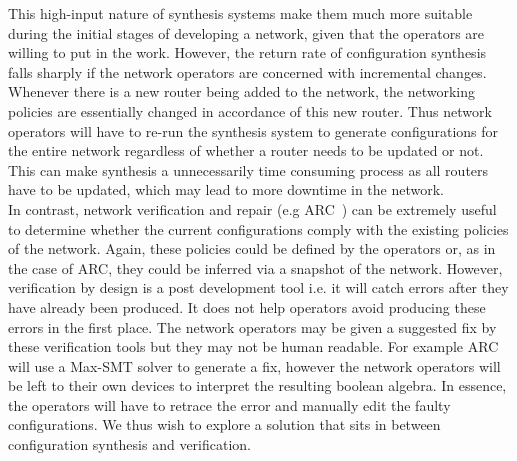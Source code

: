This high-input nature of synthesis systems make them much more suitable during the initial stages of developing a network, given that the operators are willing to put in the work. However, the return rate of configuration synthesis falls sharply if the network operators are concerned with incremental changes. Whenever there is a new router being added to the network, the networking policies are essentially changed in accordance of this new router. Thus network operators will have to re-run the synthesis system to generate configurations for the entire network regardless of whether a router needs to be updated or not. This can make synthesis a unnecessarily time consuming process as all routers have to be updated, which may lead to more downtime in the network.\\ 

In contrast, network verification and repair (e.g ARC~\cite{arc}) can be extremely useful to determine whether the current configurations comply with the existing policies of the network. Again, these policies could be defined by the operators or, as in the case of ARC, they could be inferred via a snapshot of the network. However, verification by design is a post development tool i.e. it will catch errors after they have already been produced. It does not help operators avoid producing these errors in the first place. The network operators may be given a suggested fix by these verification tools but they may not be human readable. For example ARC will use a Max-SMT solver to generate a fix, however the network operators will be left to their own devices to interpret the resulting boolean algebra. In essence, the operators will have to retrace the error and manually edit the faulty configurations. We thus wish to explore a solution that sits in between configuration synthesis and verification.\\

